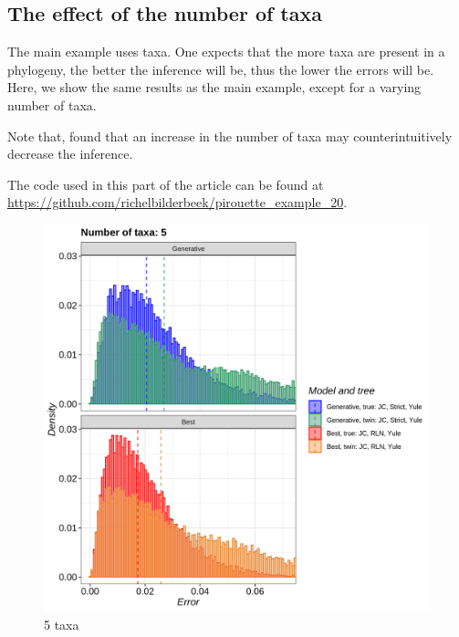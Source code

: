 \subsection{The effect of the number of taxa}
\label{subsec:n_taxa}


The main example uses  taxa.
One expects that the more taxa are present in a phylogeny,
the better the inference will be, 
thus the lower the errors will be.
Here, we show the same results as the main example,
except for a varying number of taxa.

Note that,  found that an increase in the number
of taxa may counterintuitively decrease the inference.

The code used in this part of the article can be found at 
\url{https://github.com/richelbilderbeek/pirouette_example_20}. 


\begin{figure}[H]
  \includegraphics[width=\textwidth]{pirouette_example_20/errors_5.png}
  \caption{5 taxa}
\end{figure}


